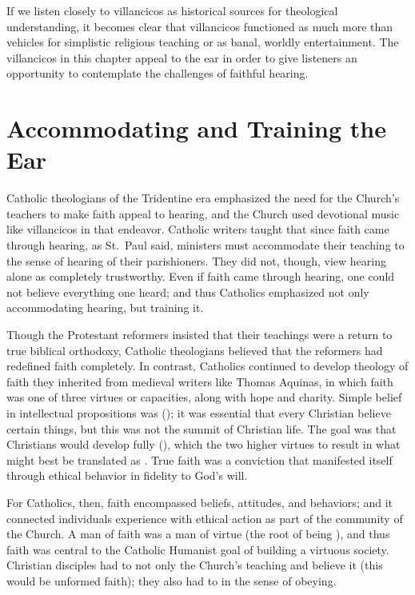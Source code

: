 If we listen closely to villancicos as historical sources for theological understanding, it becomes clear that villancicos functioned as much more than vehicles for simplistic religious teaching or as banal, worldly entertainment.
The villancicos in this chapter appeal to the ear in order to give listeners an opportunity to contemplate the challenges of faithful hearing.

\section{Accommodating and Training the Ear}

Catholic theologians of the Tridentine era emphasized the need for the Church's teachers to make faith appeal to hearing, and the Church used devotional music like villancicos in that endeavor.
Catholic writers taught that since faith came through hearing, as St.\ Paul said, ministers must accommodate their teaching to the sense of hearing of their parishioners.
They did not, though, view hearing alone as completely trustworthy.
Even if faith came through hearing, one could not believe everything one heard; and thus Catholics emphasized not only accommodating hearing, but training it.

Though the Protestant reformers insisted that their teachings were a return to true biblical orthodoxy, Catholic theologians believed that the reformers had redefined faith completely.
In contrast, Catholics continued to develop theology of faith they inherited from medieval writers like Thomas Aquinas, in which faith was one of three virtues or capacities, along with hope and charity.%
    \Autocite[130--132]{Schreiner:Certainty}
Simple belief in intellectual propositions was  (); it was essential that every Christian believe certain things, but this was not the summit of Christian life.
The goal was that Christians would develop fully  (), which  the two higher virtues to result in what might best be translated as .
True faith was a conviction that manifested itself through ethical behavior in fidelity to God's will.%
    \Autocite[, 15--20]{Catholic:Catechismus1614}

For Catholics, then, faith encompassed beliefs, attitudes, and behaviors; and it connected individuals experience with ethical action as part of the community of the Church.
A man of faith was a man of virtue (the root of  being ), and thus faith was central to the Catholic Humanist goal of building a virtuous society.
Christian disciples had to not only  the Church's teaching and believe it (this would be unformed faith); they also had to  in the sense of obeying.

